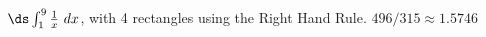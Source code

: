 {$\ds \int_{1}^9 \frac1x\ dx$, with 4 rectangles using the Right Hand Rule.
}
{$496/315\approx 1.5746$
}


